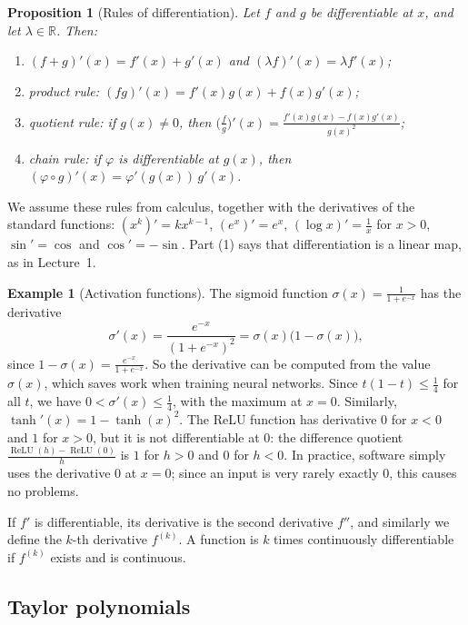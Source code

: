 \documentclass[11pt]{article}
\theoremstyle{definition}
\newtheorem{example}[definition]{Example}
\theoremstyle{plain}
\newtheorem{proposition}[definition]{Proposition}
\theoremstyle{remark}
\DeclareMathOperator{\ReLU}{ReLU}
\begin{document}
\begin{proposition}[Rules of differentiation]\label{prop:rules-1d}
    Let $f$ and $g$ be differentiable at $x$, and let $\lambda \in \mathbb{R}$. Then:
    \begin{enumerate}
        \item $(f + g)'(x) = f'(x) + g'(x)$ and $(\lambda f)'(x) = \lambda f'(x)$;
        \item product rule: $(fg)'(x) = f'(x) g(x) + f(x) g'(x)$;
        \item quotient rule: if $g(x) \neq 0$, then $\big(\frac{f}{g}\big)'(x) = \frac{f'(x) g(x) - f(x) g'(x)}{g(x)^2}$;
        \item chain rule: if $\varphi$ is differentiable at $g(x)$, then $(\varphi \circ g)'(x) = \varphi'(g(x))\, g'(x)$.
    \end{enumerate}
\end{proposition}

We assume these rules from calculus, together with the derivatives of the standard functions: $(x^k)' = k x^{k-1}$, $(e^x)' = e^x$, $(\log x)' = \frac{1}{x}$ for $x > 0$, $\sin' = \cos$ and $\cos' = -\sin$. Part (1) says that differentiation is a linear map, as in Lecture~1.

\begin{example}[Activation functions]\label{ex:sigmoid}
    The sigmoid function $\sigma(x) = \frac{1}{1 + e^{-x}}$ has the derivative
    \[\sigma'(x) = \frac{e^{-x}}{(1 + e^{-x})^2} = \sigma(x) \big(1 - \sigma(x)\big),\]
    since $1 - \sigma(x) = \frac{e^{-x}}{1 + e^{-x}}$. So the derivative can be computed from the value $\sigma(x)$, which saves work when training neural networks. Since $t(1 - t) \leq \frac{1}{4}$ for all $t$, we have $0 < \sigma'(x) \leq \frac{1}{4}$, with the maximum at $x = 0$. Similarly, $\tanh'(x) = 1 - \tanh(x)^2$. The ReLU function has derivative $0$ for $x < 0$ and $1$ for $x > 0$, but it is not differentiable at $0$: the difference quotient $\frac{\ReLU(h) - \ReLU(0)}{h}$ is $1$ for $h > 0$ and $0$ for $h < 0$. In practice, software simply uses the derivative $0$ at $x = 0$; since an input is very rarely exactly $0$, this causes no problems.
\end{example}

If $f'$ is differentiable, its derivative is the second derivative $f''$, and similarly we define the $k$-th derivative $f^{(k)}$. A function is $k$ times continuously differentiable if $f^{(k)}$ exists and is continuous.

\subsection{Taylor polynomials}
\end{document}
